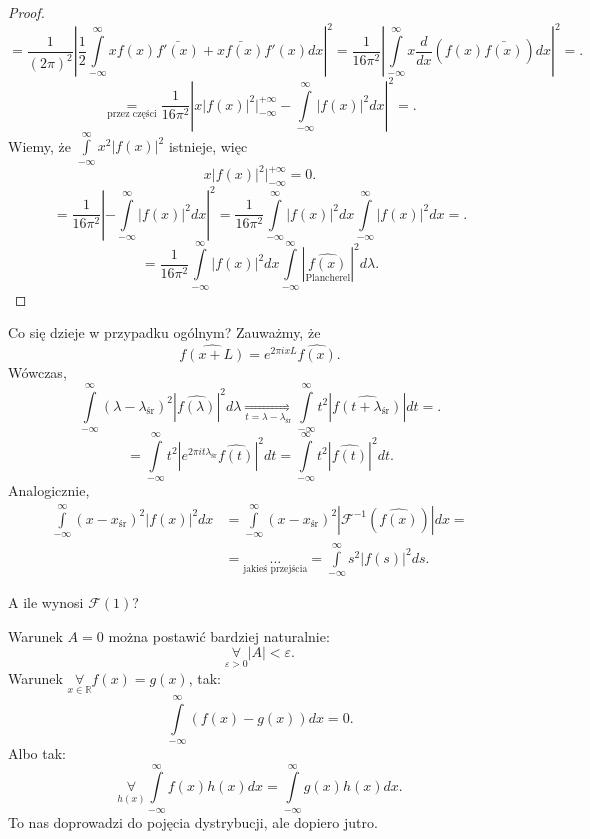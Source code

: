 \documentclass[../main.tex]{subfiles}
\begin{document}
\begin{proof}
\[\]
    \[
        =\frac{1}{(2\pi)^2}\left|\frac{1}{2} \int\limits_{-\infty}^{\infty} xf(x) \bar{f'(x)} + \bar{xf(x)} f'(x) dx\right|^2 = \frac{1}{16\pi^2} \left| \int\limits_{-\infty}^{\infty} x \frac{d}{dx}\left( f(x)\bar{f(x)} \right)dx\right|^2 =
.\]
\[
    \underset{\text{przez części}}{=} \frac{1}{16\pi^2}\left| x\left| f(x) \right| ^2 \Big|_{-\infty}^{+\infty} - \int\limits_{-\infty}^{\infty} \left| f(x) \right| ^2 dx \right|^2=
.\]
Wiemy, że $\int\limits_{-\infty}^{\infty}   x^2 \left| f(x) \right| ^2$ istnieje, więc
\[
    x\left| f(x) \right| ^2 \Big|_{-\infty}^{+\infty} = 0
.\]
\[
    = \frac{1}{16\pi^2}\left| -\int\limits_{-\infty}^{\infty} \left| f(x) \right| ^2dx  \right| ^2 = \frac{1}{16\pi^2} \int\limits_{-\infty}^{\infty} \left| f(x) \right| ^2dx \int\limits_{-\infty}^{\infty} \left| f(x) \right| ^2 dx =
.\]
\[
    = \frac{1}{16\pi^2}\int\limits_{-\infty}^{\infty} \left| f(x) \right| ^2 dx \int\limits_{-\infty}^{\infty} \left| \underset{\text{Plancherel}}{\widehat{f(x)}} \right|^2 d\lambda
.\]
\end{proof}
Co się dzieje w przypadku ogólnym? Zauważmy, że
\[
    \widehat{f(x+L)} = e^{2\pi ixL}\widehat{f(x)}
.\]
Wówczas,
\[
    \int\limits_{-\infty}^{\infty} \left( \lambda - \lambda_{\text{śr}} \right)^2 \left| \widehat{f(\lambda)} \right|^2 d\lambda \underset{t = \lambda - \lambda_{\text{śr}}}{\Longrightarrow} \int\limits_{-\infty}^{\infty}  t^2 \left| \widehat{f(t + \lambda_{\text{śr}})} \right|dt =
.\]
\[
    = \int\limits_{-\infty}^{\infty} t^2 \left| e^{2\pi i t \lambda_{\text{śr}}} \widehat{f(t)}\right|^2 dt = \int\limits_{-\infty}^{\infty}  t^2 \left| \widehat{f(t)} \right|^2 dt
.\]
Analogicznie,
\begin{align*}
    \int\limits_{-\infty}^{\infty} \left( x-x_{\text{śr}} \right) ^2 \left| f(x) \right| ^2 dx &= \int\limits_{-\infty}^{\infty} \left( x - x_{\text{śr}} \right) ^2 \left| \mathcal{F}^{-1}\left( \widehat{f(x)} \right)  \right| dx =\\
    &= \underset{\text{jakieś przejścia}}{\ldots} = \int\limits_{-\infty}^{\infty}  s^2 \left| f(s) \right| ^2 ds
.\end{align*}
\begin{pytanie}
    A ile wynosi $\mathcal{F}(1)$?
\end{pytanie}
Warunek $A = 0$ można postawić bardziej naturalnie:
 \[
    \underset{\varepsilon > 0}{\forall} \left| A \right|  < \varepsilon
.\]
Warunek $\underset{x\in \mathbb{R}}{\forall} f(x) = g(x)$, tak:
\[
    \int\limits_{-\infty}^{\infty} \left( f(x) - g(x) \right)dx = 0
.\]
Albo tak:
\[
    \underset{h(x)}{\forall} \int\limits_{-\infty}^{\infty} f(x)h(x)dx = \int\limits_{-\infty}^{\infty} g(x)h(x) dx
.\]
To nas doprowadzi do pojęcia dystrybucji, ale dopiero jutro.
\end{document}
